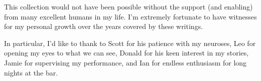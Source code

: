 This collection would not have been possible without the support (and enabling)
from many excellent humans in my life. I'm extremely fortunate to have witnesses
for my personal growth over the years covered by these writings.

In particular, I'd like to thank to Scott for his patience with my neuroses, Leo
for opening my eyes to what we can see, Donald for his keen interest in my
stories, Jamie for supervising my performance, and Ian for endless enthusiasm
for long nights at the bar.
